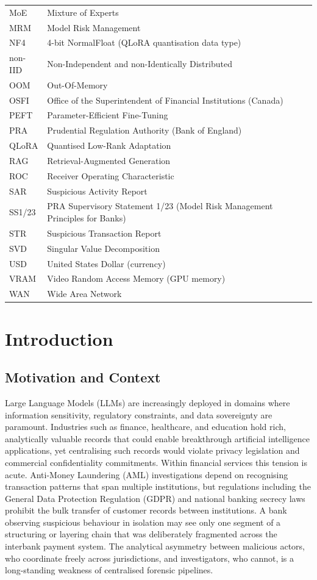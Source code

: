 \documentclass{report}
\begin{document}
\begin{tabularx}{\textwidth}{l X}
MoE & Mixture of Experts \\
MRM & Model Risk Management \\
NF4 & 4-bit NormalFloat (QLoRA quantisation data type) \\
non-IID & Non-Independent and non-Identically Distributed \\
OOM & Out-Of-Memory \\
OSFI & Office of the Superintendent of Financial Institutions (Canada) \\
PEFT & Parameter-Efficient Fine-Tuning \\
PRA & Prudential Regulation Authority (Bank of England) \\
QLoRA & Quantised Low-Rank Adaptation \\
RAG & Retrieval-Augmented Generation \\
ROC & Receiver Operating Characteristic \\
SAR & Suspicious Activity Report \\
SS1/23 & PRA Supervisory Statement 1/23 (Model Risk Management Principles for Banks) \\
STR & Suspicious Transaction Report \\
SVD & Singular Value Decomposition \\
USD & United States Dollar (currency) \\
VRAM & Video Random Access Memory (GPU memory) \\
WAN & Wide Area Network \\
\bottomrule
\end{tabularx}

\chapter{Introduction}
\label{ch:introduction}

\section{Motivation and Context}

Large Language Models (LLMs) are increasingly deployed in domains where information sensitivity, regulatory constraints, and data sovereignty are paramount. Industries such as finance, healthcare, and education hold rich, analytically valuable records that could enable breakthrough artificial intelligence applications, yet centralising such records would violate privacy legislation and commercial confidentiality commitments. Within financial services this tension is acute. Anti-Money Laundering (AML) investigations depend on recognising transaction patterns that span multiple institutions, but regulations including the General Data Protection Regulation (GDPR) and national banking secrecy laws prohibit the bulk transfer of customer records between institutions. A bank observing suspicious behaviour in isolation may see only one segment of a structuring or layering chain that was deliberately fragmented across the interbank payment system. The analytical asymmetry between malicious actors, who coordinate freely across jurisdictions, and investigators, who cannot, is a long-standing weakness of centralised forensic pipelines.
\end{document}
